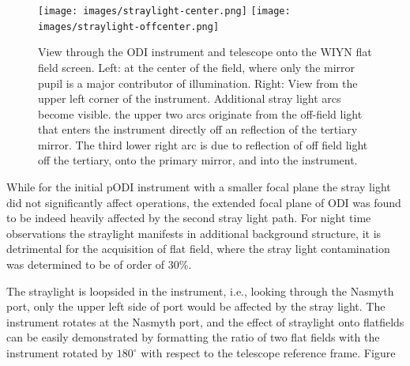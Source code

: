 \documentclass[]{spieman}
\begin{document}
\begin{figure}[]
	\centering
	\texttt{[image: images/straylight-center.png]}
	\texttt{[image: images/straylight-offcenter.png]}
	\caption{\label{fig_straylight} View through the ODI instrument and 
	telescope
	onto the WIYN flat field screen. Left: at the center of the field, where 
	only
	the mirror pupil is a major contributor of illumination. Right: View from 
	the
	upper left corner of the instrument. Additional stray light arcs become
	visible. the upper two arcs originate from the off-field light that enters 
	the
	instrument directly off an reflection of the tertiary mirror. The third 
	lower
	right arc is due to reflection of off field light off the tertiary, onto the
	primary mirror, and  into the instrument. }
\end{figure}


While for the initial pODI instrument with a smaller focal plane the stray
light did not significantly affect operations, the extended focal plane of
ODI was found to be indeed heavily affected by the second stray light path.
For night time observations the straylight manifests in additional
background structure, it is detrimental for the acquisition of flat field,
where the stray light contamination was determined to be of order of 30\%.

The straylight is loopsided in the instrument, i.e., looking through the
Nasmyth port, only the upper left side of port would be affected by the
stray light. The instrument rotates at the Nasmyth port, and the effect of
straylight onto flatfields can be easily demonstrated by formatting the ratio
of two flat fields with the instrument rotated by $180^\circ$ with respect
to the telescope reference frame. Figure \label{fig_flatfieldbaffle}
\end{document}
